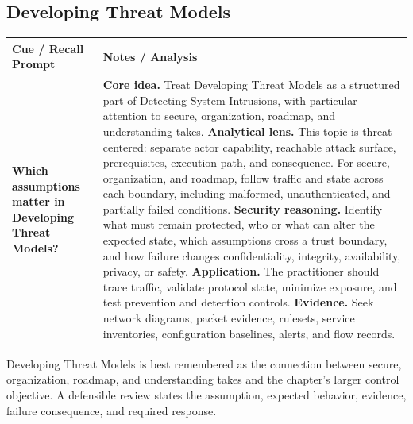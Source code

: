 \documentclass[11pt]{article}
\newcommand{\CornellHeader}{%
\rowcolor{Navy}\color{white}\bfseries Cue / Recall Prompt & \color{white}\bfseries Notes / Analysis\\\hline}
\newcommand{\CornellRow}[2]{%
\cellcolor{CueGray}\RaggedRight\textbf{#1} & \RaggedRight #2\\\hline}
\begin{document}
\subsection*{Developing Threat Models}
\begin{longtable}{>{\RaggedRight\arraybackslash}p{}|>{\RaggedRight\arraybackslash}p{}}
\CornellHeader
\CornellRow{Which assumptions matter in Developing Threat Models?}{\textbf{Core idea.} Treat Developing Threat Models as a structured part of Detecting System Intrusions, with particular attention to secure, organization, roadmap, and understanding takes. \textbf{Analytical lens.} This topic is threat-centered: separate actor capability, reachable attack surface, prerequisites, execution path, and consequence. For secure, organization, and roadmap, follow traffic and state across each boundary, including malformed, unauthenticated, and partially failed conditions. \textbf{Security reasoning.} Identify what must remain protected, who or what can alter the expected state, which assumptions cross a trust boundary, and how failure changes confidentiality, integrity, availability, privacy, or safety. \textbf{Application.} The practitioner should trace traffic, validate protocol state, minimize exposure, and test prevention and detection controls. \textbf{Evidence.} Seek network diagrams, packet evidence, rulesets, service inventories, configuration baselines, alerts, and flow records.}
\end{longtable}
\begin{topicsummary}
Developing Threat Models is best remembered as the connection between secure, organization, roadmap, and understanding takes and the chapter's larger control objective. A defensible review states the assumption, expected behavior, evidence, failure consequence, and required response.
\end{topicsummary}
\end{document}

